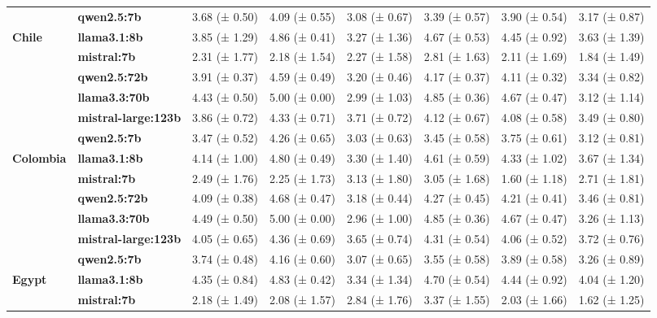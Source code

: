\begin{longtable}{llllllll}
\textbf{} & \textbf{qwen2.5:7b} & 3.68 (± 0.50) & 4.09 (± 0.55) & 3.08 (± 0.67) & 3.39 (± 0.57) & 3.90 (± 0.54) & 3.17 (± 0.87) \\
\cline{1-8}
\multirow[t]{6}{*}{\textbf{Chile}} & \textbf{llama3.1:8b} & 3.85 (± 1.29) & 4.86 (± 0.41) & 3.27 (± 1.36) & 4.67 (± 0.53) & 4.45 (± 0.92) & 3.63 (± 1.39) \\
\textbf{} & \textbf{mistral:7b} & 2.31 (± 1.77) & 2.18 (± 1.54) & 2.27 (± 1.58) & 2.81 (± 1.63) & 2.11 (± 1.69) & 1.84 (± 1.49) \\
\textbf{} & \textbf{qwen2.5:72b} & 3.91 (± 0.37) & 4.59 (± 0.49) & 3.20 (± 0.46) & 4.17 (± 0.37) & 4.11 (± 0.32) & 3.34 (± 0.82) \\
\textbf{} & \textbf{llama3.3:70b} & 4.43 (± 0.50) & 5.00 (± 0.00) & 2.99 (± 1.03) & 4.85 (± 0.36) & 4.67 (± 0.47) & 3.12 (± 1.14) \\
\textbf{} & \textbf{mistral-large:123b} & 3.86 (± 0.72) & 4.33 (± 0.71) & 3.71 (± 0.72) & 4.12 (± 0.67) & 4.08 (± 0.58) & 3.49 (± 0.80) \\
\textbf{} & \textbf{qwen2.5:7b} & 3.47 (± 0.52) & 4.26 (± 0.65) & 3.03 (± 0.63) & 3.45 (± 0.58) & 3.75 (± 0.61) & 3.12 (± 0.81) \\
\cline{1-8}
\multirow[t]{6}{*}{\textbf{Colombia}} & \textbf{llama3.1:8b} & 4.14 (± 1.00) & 4.80 (± 0.49) & 3.30 (± 1.40) & 4.61 (± 0.59) & 4.33 (± 1.02) & 3.67 (± 1.34) \\
\textbf{} & \textbf{mistral:7b} & 2.49 (± 1.76) & 2.25 (± 1.73) & 3.13 (± 1.80) & 3.05 (± 1.68) & 1.60 (± 1.18) & 2.71 (± 1.81) \\
\textbf{} & \textbf{qwen2.5:72b} & 4.09 (± 0.38) & 4.68 (± 0.47) & 3.18 (± 0.44) & 4.27 (± 0.45) & 4.21 (± 0.41) & 3.46 (± 0.81) \\
\textbf{} & \textbf{llama3.3:70b} & 4.49 (± 0.50) & 5.00 (± 0.00) & 2.96 (± 1.00) & 4.85 (± 0.36) & 4.67 (± 0.47) & 3.26 (± 1.13) \\
\textbf{} & \textbf{mistral-large:123b} & 4.05 (± 0.65) & 4.36 (± 0.69) & 3.65 (± 0.74) & 4.31 (± 0.54) & 4.06 (± 0.52) & 3.72 (± 0.76) \\
\textbf{} & \textbf{qwen2.5:7b} & 3.74 (± 0.48) & 4.16 (± 0.60) & 3.07 (± 0.65) & 3.55 (± 0.58) & 3.89 (± 0.58) & 3.26 (± 0.89) \\
\cline{1-8}
\multirow[t]{6}{*}{\textbf{Egypt}} & \textbf{llama3.1:8b} & 4.35 (± 0.84) & 4.83 (± 0.42) & 3.34 (± 1.34) & 4.70 (± 0.54) & 4.44 (± 0.92) & 4.04 (± 1.20) \\
\textbf{} & \textbf{mistral:7b} & 2.18 (± 1.49) & 2.08 (± 1.57) & 2.84 (± 1.76) & 3.37 (± 1.55) & 2.03 (± 1.66) & 1.62 (± 1.25) \\

\end{longtable}
